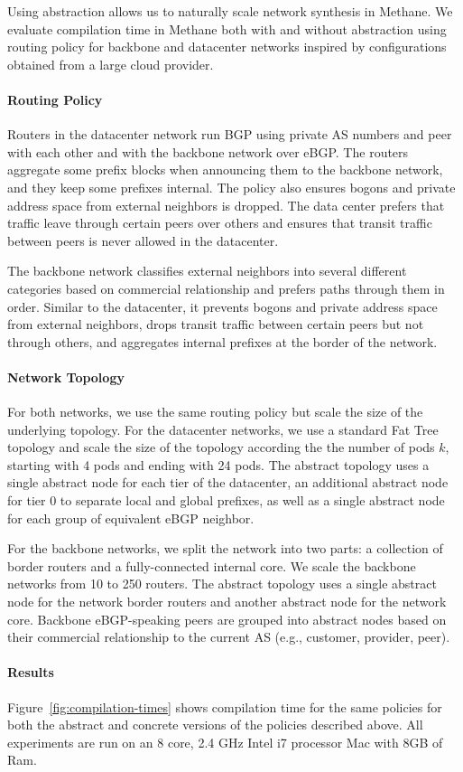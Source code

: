 \documentclass{sig-alternate-10pt}
\newcommand{\sysname}{{\small \sf Methane}\xspace}
\newcommand{\para}[1]{\paragraph*{\textbf{#1}}}
\begin{document}
Using abstraction allows us to naturally scale network synthesis in \sysname. We evaluate compilation time in \sysname both with and without abstraction using routing policy for backbone and datacenter networks inspired by configurations obtained from a large cloud provider.

\para{Routing Policy}

Routers in the datacenter network run BGP using private AS numbers and peer with each other and with the backbone network over eBGP. The routers aggregate some prefix blocks when announcing them to the backbone network, and they keep some prefixes internal. The policy also ensures bogons and private address space from external neighbors is dropped. The data center prefers that traffic leave through certain peers over others and ensures that transit traffic between peers is never allowed in the datacenter.

The backbone network classifies external neighbors into several different categories based on commercial relationship and prefers paths through them in order. Similar to the datacenter, it prevents bogons and private address space from external neighbors, drops transit traffic between certain peers but not through others, and aggregates internal prefixes at the border of the network.

\para{Network Topology}

For both networks, we use the same routing policy but scale the size of the underlying topology. For the datacenter networks, we use a standard Fat Tree topology and scale the size of the topology according the the number of pods $k$, starting with 4 pods and ending with 24 pods. The abstract topology uses a single abstract node for each tier of the datacenter, an additional abstract node for tier 0 to separate local and global prefixes, as well as a single abstract node for each group of equivalent eBGP neighbor. 

For the backbone networks, we split the network into two parts: a collection of border routers and a fully-connected internal core. We scale the backbone networks from 10 to 250 routers. The abstract topology uses a single abstract node for the network border routers and another abstract node for the network core. Backbone eBGP-speaking peers are grouped into abstract nodes based on their commercial relationship to the current AS (e.g., customer, provider, peer).

\para{Results}

Figure~\ref{fig:compilation-times} shows compilation time for the same policies for both the abstract and concrete versions of the policies described above. All experiments are run on an 8 core, 2.4 GHz Intel i7 processor Mac with 8GB of Ram.
\end{document}
